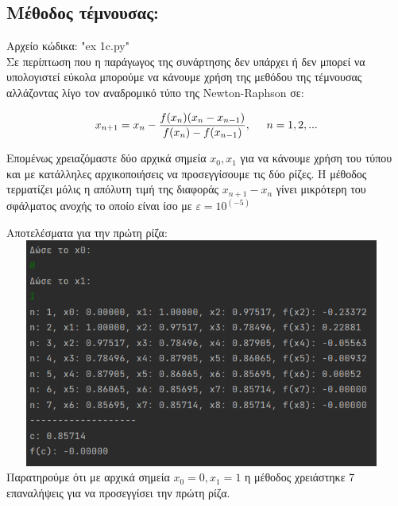 \documentclass{article}
\begin{document}
\subsection{Μέθοδος τέμνουσας: }

Αρχείο κώδικα: "ex 1c.py" \\

Σε περίπτωση που η παράγωγος της συνάρτησης δεν υπάρχει ή δεν μπορεί να υπολογιστεί εύκολα μπορούμε να κάνουμε χρήση της μεθόδου της τέμνουσας αλλάζοντας λίγο τον αναδρομικό τύπο της Newton-Raphson σε:

\[x_{n+1} = x_n - \frac{f(x_n)(x_n - x_{n-1})}{f(x_n) - f(x_{n-1})} , \hspace{0.5cm} n = 1, 2, ...\]

Επομένως χρειαζόμαστε δύο αρχικά σημεία \(x_0, x_1\) για να κάνουμε χρήση του τύπου και με κατάλληλες αρχικοποιήσεις να προσεγγίσουμε τις δύο ρίζες. Η μέθοδος τερματίζει μόλις η απόλυτη τιμή της διαφοράς \(x_{n+1} - x_{n}\) γίνει μικρότερη του σφάλματος ανοχής το οποίο είναι ίσο με \(ε = 10^{(-5)}\)

\pagebreak
Αποτελέσματα για την πρώτη ρίζα: \vspace{3mm} \\
\includegraphics[width=13cm, height=7.5cm]{images/results_5.png} \\

Παρατηρούμε ότι με αρχικά σημεία \(x_0 = 0, x_1 = 1\) η μέθοδος χρειάστηκε 7 επαναλήψεις για να προσεγγίσει την πρώτη ρίζα. \\ 
\end{document}
